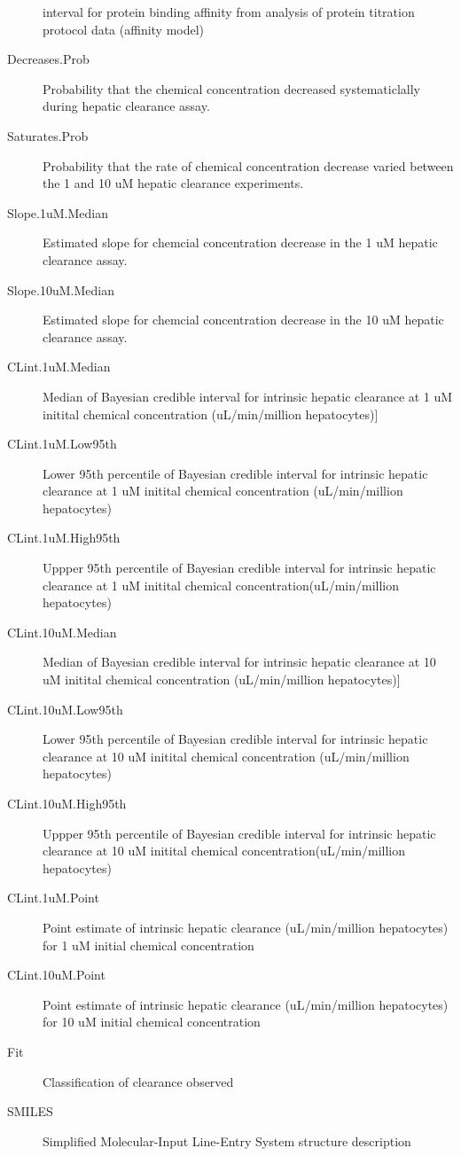 \documentclass[a4paper]{book}
\begin{document}
\begin{Format}
\begin{description}
interval for protein binding affinity from analysis of protein
titration protocol data (affinity model)
\item[Decreases.Prob] Probability that the chemical concentration decreased
systematiclally during hepatic clearance assay.
\item[Saturates.Prob] Probability that the rate of chemical concentration
decrease varied between the 1 and 10 uM hepatic clearance experiments.
\item[Slope.1uM.Median] Estimated slope for chemcial concentration decrease
in the 1 uM hepatic clearance assay.
\item[Slope.10uM.Median] Estimated slope for chemcial concentration decrease
in the 10 uM hepatic clearance assay.
\item[CLint.1uM.Median] Median of Bayesian credible interval for intrinsic
hepatic clearance at 1 uM initital chemical concentration (uL/min/million hepatocytes)]
\item[CLint.1uM.Low95th] Lower 95th percentile of Bayesian credible
interval for intrinsic hepatic clearance at 1 uM initital chemical
concentration (uL/min/million hepatocytes)
\item[CLint.1uM.High95th] Uppper 95th percentile of Bayesian credible
interval for intrinsic hepatic clearance at 1 uM initital chemical
concentration(uL/min/million hepatocytes)
\item[CLint.10uM.Median] Median of Bayesian credible interval for intrinsic
hepatic clearance at 10 uM initital chemical concentration (uL/min/million hepatocytes)]
\item[CLint.10uM.Low95th] Lower 95th percentile of Bayesian credible
interval for intrinsic hepatic clearance at 10 uM initital chemical
concentration (uL/min/million hepatocytes)
\item[CLint.10uM.High95th] Uppper 95th percentile of Bayesian credible
interval for intrinsic hepatic clearance at 10 uM initital chemical
concentration(uL/min/million hepatocytes)
\item[CLint.1uM.Point] Point estimate of intrinsic hepatic clearance
(uL/min/million hepatocytes) for 1 uM initial chemical concentration
\item[CLint.10uM.Point] Point estimate of intrinsic hepatic clearance
(uL/min/million hepatocytes) for 10 uM initial chemical concentration
\item[Fit] Classification of clearance observed
\item[SMILES] Simplified Molecular-Input Line-Entry System structure
description

\end{description}

\end{Format}
\end{document}

